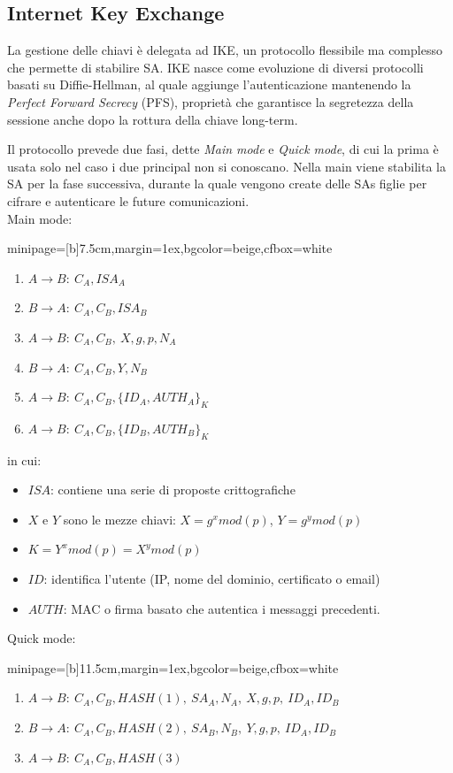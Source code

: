 \documentclass[a4paper, 11pt, twoside, openright, fleqn]{report}
\newcommand{\fromto}[2]{#1\rightarrow #2\!:\ }
\newenvironment{colbox}[2]%
{%
	\par\noindent\hspace{10pt}
	\begin{adjustbox}{minipage=[b]{#2},margin=1ex,bgcolor=#1,cfbox=white}
}{%
	\end{adjustbox}\newline%
}
\begin{document}
\subsection{Internet Key Exchange}
La gestione delle chiavi è delegata ad IKE, un protocollo flessibile ma complesso che permette di stabilire SA. IKE nasce come evoluzione di diversi protocolli basati su Diffie-Hellman, al quale aggiunge l'autenticazione mantenendo la \emph{Perfect Forward Secrecy} (PFS), proprietà che garantisce la segretezza della sessione anche dopo la rottura della chiave long-term.

Il protocollo prevede due fasi, dette \emph{Main mode} e \emph{Quick mode}, di cui la prima è usata solo nel caso i due principal non si conoscano. Nella main viene stabilita la SA per la fase successiva, durante la quale vengono create delle SAs figlie per cifrare e autenticare le future comunicazioni.\\
Main mode:
\begin{colbox}{beige}{7.5cm}
	\begin{enumerate}
		\item $\fromto{A}{B}C_A,ISA_A$
		\item $\fromto{B}{A}C_A,C_B,ISA_B$
		\item $\fromto{A}{B}C_A,C_B,\ X,g,p,N_A$
		\item $\fromto{B}{A}C_A,C_B,Y,N_B$
		\item $\fromto{A}{B}C_A,C_B,\{ID_A,AUTH_A\}_K$
		\item $\fromto{A}{B}C_A,C_B,\{ID_B,AUTH_B\}_K$
	\end{enumerate}
\end{colbox}
in cui:
\begin{itemize}
	\item $ISA$: contiene una serie di proposte crittografiche
	\item $X$ e $Y$ sono le mezze chiavi: $X = g^xmod(p)$, $Y = g^ymod(p)$
	\item $K = Y^xmod(p) = X^ymod(p)$
	\item $ID$: identifica l'utente (IP, nome del dominio, certificato o email)
	\item $AUTH$: MAC o firma basato che autentica i messaggi precedenti.
\end{itemize}
Quick mode:
\begin{colbox}{beige}{11.5cm}
	\begin{enumerate}
		\item $\fromto{A}{B}C_A,C_B,HASH(1),\ SA_A,N_A,\ X,g,p,\ ID_A,ID_B$
		\item $\fromto{B}{A}C_A,C_B,HASH(2),\ SA_B,N_B,\ Y,g,p,\ ID_A,ID_B$
		\item $\fromto{A}{B}C_A,C_B,HASH(3)$
	\end{enumerate}
\end{colbox}
\end{document}
